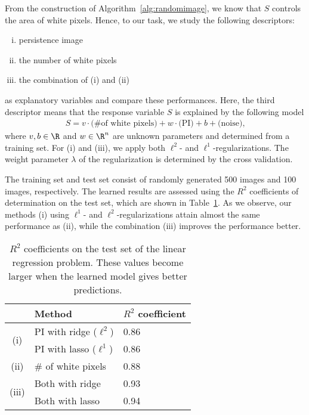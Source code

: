 \documentclass[smallextended]{svjour3}
\begin{document}
From the construction of Algorithm~\ref{alg:randomimage}, we know that $S$ controls the area of white pixels. Hence, to our task, we study the following descriptors:
\begin{enumerate}[(i)]
\item persistence image
\item the number of white pixels
\item the combination of (i) and (ii)
\end{enumerate}
as explanatory variables and compare these performances.
Here, the third descriptor means that the response variable $S$ is explained by the following model
\begin{align}
  S = v\cdot\textrm{(\# of white pixels)} + w \cdot \textrm{(PI)} + b +
      \textrm{(noise),} \label{eq:im_linearmodel} 
\end{align}
where $v, b \in \R$ and $w \in \R^n$ are unknown parameters and determined from a training set. For (i) and (iii), we apply both $\ell^2$- and $\ell^1$-regularizations. The weight parameter $\lambda$ of the regularization is determined by the cross validation.

The training set and test set consist of randomly generated 500 images and 100 images, respectively. The learned results are assessed using the $R^2$ coefficients of determination\citep{statistics} on the test set, which are shown in Table~\ref{tab:linreg_r2}.
As we observe, our methods (i) using $\ell^1$- and $\ell^2$-regularizations attain almost the same performance as (ii), while the combination (iii) improves the performance better. 

\begin{table}[htbp]
  \centering
  \begin{tabular}{|c|l|l|} \hline
    &Method & $R^2$ coefficient \\ \hline\hline
    \multirow{2}{*}{(i)} & PI with ridge ($\ell^2$) & 0.86 \\ \cline{2-3} %
    &PI with lasso ($\ell^1$) & 0.86 \\ \hline %
    (ii)&\# of white pixels & 0.88 \\ \hline %
    \multirow{2}{*}{(iii)}&Both with ridge & 0.93 \\ \cline{2-3} %
    &Both with lasso & 0.94 \\ \hline %
  \end{tabular}
  \caption{$R^2$ coefficients on the test set of the linear regression problem. These values become larger when the learned model gives better predictions.}
  \label{tab:linreg_r2}
\end{table}
\end{document}

